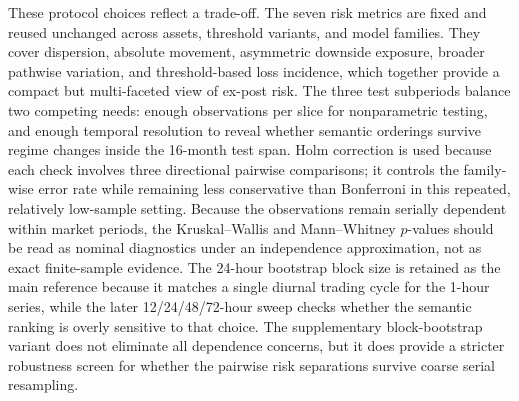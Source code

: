\documentclass[a4paper,fleqn]{cas-dc}
\begin{document}
These protocol choices reflect a trade-off. The seven risk metrics are fixed and reused unchanged across assets, threshold variants, and model families. They cover dispersion, absolute movement, asymmetric downside exposure, broader pathwise variation, and threshold-based loss incidence, which together provide a compact but multi-faceted view of ex-post risk. The three test subperiods balance two competing needs: enough observations per slice for nonparametric testing, and enough temporal resolution to reveal whether semantic orderings survive regime changes inside the 16-month test span. Holm correction is used because each check involves three directional pairwise comparisons; it controls the family-wise error rate while remaining less conservative than Bonferroni in this repeated, relatively low-sample setting. Because the observations remain serially dependent within market periods, the Kruskal--Wallis and Mann--Whitney $p$-values should be read as nominal diagnostics under an independence approximation, not as exact finite-sample evidence. The 24-hour bootstrap block size is retained as the main reference because it matches a single diurnal trading cycle for the 1-hour series, while the later 12/24/48/72-hour sweep checks whether the semantic ranking is overly sensitive to that choice. The supplementary block-bootstrap variant does not eliminate all dependence concerns, but it does provide a stricter robustness screen for whether the pairwise risk separations survive coarse serial resampling.
\end{document}
